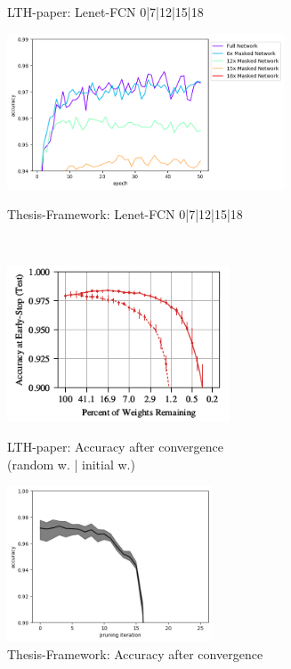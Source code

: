\begin{figure}
\begin{minipage}{0.5\textwidth}
		\caption*{LTH-paper: Lenet-FCN 0|7|12|15|18}
		\label{?}
	\end{minipage}\hfill
	\begin{minipage}{0.5\textwidth}
		\centering
		\includegraphics[height=175px]{gfx/Experiments/Reproduction-MNIST-FCN/accuracy/LTH_2.png}
		\caption*{Thesis-Framework: Lenet-FCN 0|7|12|15|18}
		\label{?}
	\end{minipage}
	\\
	\begin{minipage}{0.5\textwidth}
		\centering
		\includegraphics[height=175px]{gfx/7-Evaluation/LTH_0.png}
		\caption*{LTH-paper: Accuracy after convergence\\
			(random w. | initial w.)}
		\label{?}
	\end{minipage}\hfill
	\begin{minipage}{0.5\textwidth}
		\centering
		\includegraphics[height=175px]{gfx/Experiments/Reproduction-MNIST-FCN/accuracy/converged.png}
		\caption*{Thesis-Framework: Accuracy after convergence}
		\label{?}
	\end{minipage}
\end{figure}
